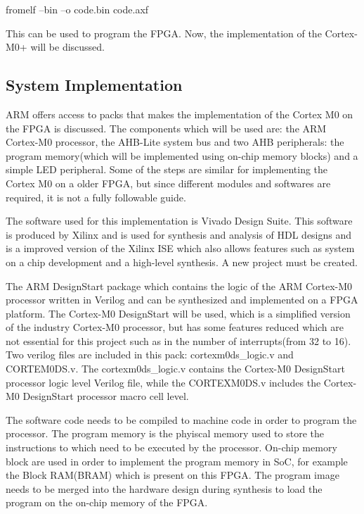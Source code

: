 fromelf --bin --o code.bin code.axf

This can be used to program the FPGA. Now, the implementation of the Cortex-M0+ will be discussed.

\subsection{System Implementation}

ARM offers access to packs that makes the implementation of the Cortex M0 on the FPGA is discussed. The components which will be used are: the ARM Cortex-M0 processor, the AHB-Lite system bus and two AHB peripherals: the program memory(which will be implemented using on-chip memory blocks) and a simple LED peripheral. Some of the steps are similar for implementing the Cortex M0 on a older FPGA, but since different modules and softwares are required, it is not a fully followable guide.

The software used for this implementation is Vivado Design Suite. This software is produced by Xilinx and is used for synthesis and analysis of HDL designs and is a improved version of the Xilinx ISE which also allows features such as system on a chip development and a high-level synthesis. A new project must be created.

The ARM DesignStart  package which contains the logic of the ARM Cortex-M0 processor written in Verilog and can be synthesized and implemented on a FPGA platform. The Cortex-M0 DesignStart will be used, which is a simplified version of the industry Cortex-M0 processor, but has some features reduced which are not essential for this project such as in the number of interrupts(from 32 to 16). Two verilog files are included in this pack:  cortexm0ds\_logic.v and CORTEM0DS.v. The cortexm0ds\_logic.v contains the Cortex-M0 DesignStart processor logic level Verilog file, while the CORTEXM0DS.v includes the Cortex-M0 DesignStart processor macro cell level.

The software code needs to be compiled to machine code in order to program the processor. The program memory is the phyiscal memory used to store the instructions to which need to be executed by the processor. On-chip memory block are used in order to implement the program memory in SoC, for example the Block RAM(BRAM) which is present on this FPGA. The program image needs to be merged into the hardware design during synthesis to load the program on the on-chip memory of the FPGA.

